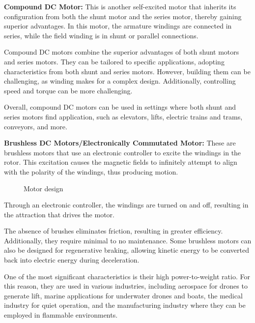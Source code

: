 \documentclass{article}
\begin{document}
\begin{flushleft}
\textbf{Compound DC Motor:} This is another self-excited motor that inherits its configuration from both the shunt motor and the series motor, thereby gaining superior advantages. In this motor, the armature windings are connected in series, while the field winding is in shunt or parallel connections. \newline


Compound DC motors combine the superior advantages of both shunt motors and series motors. They can be tailored to specific applications, adopting characteristics from both shunt and series motors. However, building them can be challenging, as winding makes for a complex design. Additionally, controlling speed and torque can be more challenging. \newline

Overall, compound DC motors can be used in settings where both shunt and series motors find application, such as elevators, lifts, electric trains and trams, conveyors, and more. \newline
\newline
 \vspace*{3pt}

 \textbf{Brushless DC Motors/Electronically Commutated Motor:} These are brushless motors that use an electronic controller to excite the windings in the rotor. This excitation causes the magnetic fields to infinitely attempt to align with the polarity of the windings, thus producing motion.

 \begin{figure}[h]
     \centering
     \caption{Motor design}
 \end{figure}
 
 Through an electronic controller, the windings are turned on and off, resulting in the attraction that drives the motor.
 
 The absence of brushes eliminates friction, resulting in greater efficiency. Additionally, they require minimal to no maintenance. Some brushless motors can also be designed for regenerative braking, allowing kinetic energy to be converted back into electric energy during deceleration.
 
 One of the most significant characteristics is their high power-to-weight ratio. For this reason, they are used in various industries, including aerospace for drones to generate lift, marine applications for underwater drones and boats, the medical industry for quiet operation, and the manufacturing industry where they can be employed in flammable environments.
 \newline
 \vspace*{3pt}
 

\end{flushleft}
\end{document}
